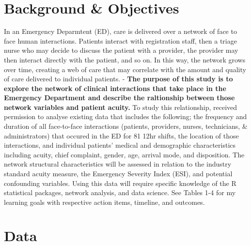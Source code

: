 \documentclass[]{elsarticle} %
\begin{document}
\section{Background \& Objectives}\label{background-objectives}

In an Emergency Deparmtent (ED), care is delivered over a network of
face to face human interactions. Patients interact with registration
staff, then a triage nurse who may decide to discuss the patient with a
provider, the provider may then interact directly with the patient, and
so on. In this way, the network grows over time, creating a web of care
that may correlate with the amount and quality of care delivered to
individual patients. - \textbf{The purpose of this study is to explore
the network of clinical interactions that take place in the Emergency
Department and describe the raltionship between those network variables
and patient acuity.} To study this relationship, received permission to
analyse existing data that includes the following; the frequency and
duration of all face-to-face interactions (patients, providers, nurses,
technicians, \& administrators) that occured in the ED for 81 12hr
shifts, the location of those interactions, and individual patients'
medical and demographic characteristics including acuity, chief
complaint, gender, age, arrival mode, and disposition. The network
structural characteristics will be assessed in relation to the industry
standard acuity measure, the Emergency Severity Index (ESI), and
potential confounding variables. Using this data will require specific
knowledge of the R statistical packages, network analysis, and data
science. See Tables 1-4 for my learning goals with respective action
items, timeline, and outcomes.

\section{Data}\label{data}
\end{document}
